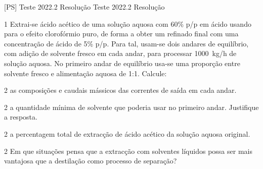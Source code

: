 \documentclass[\mainfilename]{subfiles}
\begin{document}
\graphicspath{{\subfix{./figures/PS-Tests_Resolutions.2022.2}}}

[PS]
{Teste 2022.2 Resolução} %
{Teste 2022.2 Resolução} %

\begin{questionBox}1{ %
    Extrai-se ácido acético de uma solução aquosa com 60\% p/p em ácido usando para o efeito clorofórmio puro, de forma a obter um refinado final com uma concentração de ácido de 5\% p/p. Para tal, usam-se dois andares de equilíbrio, com adição de solvente fresco em cada andar, para processar \qty*{1000}{\kilo\gram/\hour} de solução aquosa. No primeiro andar de equilíbrio usa-se uma proporção entre solvente fresco e alimentação aquosa de 1:1. Calcule:
} %
\end{questionBox}

\begin{questionBox}2{ %
    as composições e caudais mássicos das correntes de saída em cada andar.
} %
\end{questionBox}

\begin{questionBox}2{ %
    a quantidade mínima de solvente que poderia usar no primeiro andar. Justifique a resposta.
} %
\end{questionBox}

\begin{questionBox}2{ %
    a percentagem total de extracção de ácido acético da solução aquosa original.
} %
\end{questionBox}

\begin{questionBox}2{ %
    Em que situações pensa que a extracção com solventes líquidos possa ser mais vantajosa que a destilação como processo de separação?
} %
\end{questionBox}
\end{document}
